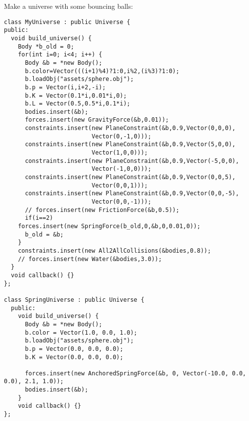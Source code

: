 Make a universe with some bouncing balls: \begin{lstlisting}
class MyUniverse : public Universe {
public:
  void build_universe() {
    Body *b_old = 0;
    for(int i=0; i<4; i++) {
      Body &b = *new Body();
      b.color=Vector(((i+1)%4)?1:0,i%2,(i%3)?1:0);
      b.loadObj("assets/sphere.obj");
      b.p = Vector(i,i+2,-i);
      b.K = Vector(0.1*i,0.01*i,0);
      b.L = Vector(0.5,0.5*i,0.1*i);
      bodies.insert(&b);
      forces.insert(new GravityForce(&b,0.01));
      constraints.insert(new PlaneConstraint(&b,0.9,Vector(0,0,0),
					     Vector(0,-1,0)));
      constraints.insert(new PlaneConstraint(&b,0.9,Vector(5,0,0),
					     Vector(1,0,0)));
      constraints.insert(new PlaneConstraint(&b,0.9,Vector(-5,0,0),
					     Vector(-1,0,0)));
      constraints.insert(new PlaneConstraint(&b,0.9,Vector(0,0,5),
					     Vector(0,0,1)));
      constraints.insert(new PlaneConstraint(&b,0.9,Vector(0,0,-5),
					     Vector(0,0,-1)));
      // forces.insert(new FrictionForce(&b,0.5));
      if(i==2)
	forces.insert(new SpringForce(b_old,0,&b,0,0.01,0));
      b_old = &b;
    }
    constraints.insert(new All2AllCollisions(&bodies,0.8));
    // forces.insert(new Water(&bodies,3.0));
  }
  void callback() {}
};

class SpringUniverse : public Universe {
  public:
    void build_universe() {
      Body &b = *new Body();
      b.color = Vector(1.0, 0.0, 1.0);
      b.loadObj("assets/sphere.obj");
      b.p = Vector(0.0, 0.0, 0.0);
      b.K = Vector(0.0, 0.0, 0.0);
      
      forces.insert(new AnchoredSpringForce(&b, 0, Vector(-10.0, 0.0, 0.0), 2.1, 1.0));
      bodies.insert(&b);
    }
    void callback() {}
};
\end{lstlisting}
\noindent
